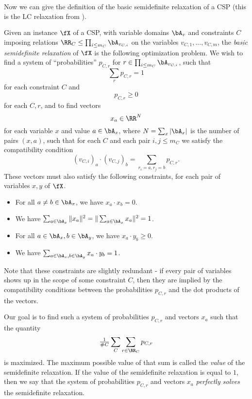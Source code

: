 Now we can give the definition of the basic semidefinite relaxation of a CSP (this is the LC relaxation from \cite{raghavendra-thesis}).

\begin{defn} Given an instance $\fX$ of a CSP, with variable domains $\bA_v$ and constraints $C$ imposing relations $\RR_C \le \prod_{i \le m_C} \bA_{v_{C,i}}$ on the variables $v_{C,1}, ..., v_{C,m}$, the \emph{basic semidefinite relaxation} of $\fX$ is the following optimization problem. We wish to find a system of ``probabilities'' $p_{C,r}$ for $r \in \prod_{i \le m_C} \bA_{v_{C,i}}$, such that
\[
\sum_{r} p_{C,r} = 1
\]
for each constraint $C$ and
\[
p_{C,r} \ge 0
\]
for each $C,r$, and to find vectors
\[
x_a \in \RR^N
\]
for each variable $x$ and value $a \in \bA_x$, where $N = \sum_x |\bA_x|$ is the number of pairs $(x,a)$, such that for each $C$ and each pair $i,j \le m_C$ we satisfy the compatibility condition
\[
(v_{C,i})_a \cdot (v_{C,j})_b = \sum_{r_i = a, r_j = b} p_{C,r}.
\]
These vectors must also satisfy the following constraints, for each pair of variables $x,y$ of $\fX$.
\begin{itemize}
\item For all $a \ne b \in \bA_x$, we have $x_a \cdot x_b = 0$.
\item We have $\sum_{a \in \bA_x} \|x_a\|^2 = \|\sum_{a \in \bA_x} x_a\|^2 = 1$.
\item For all $a \in \bA_x, b \in \bA_y$, we have $x_a \cdot y_b \ge 0$.
\item We have $\sum_{a \in \bA_x, b \in \bA_y} x_a \cdot y_b = 1$.
\end{itemize}
Note that these constraints are slightly redundant - if every pair of variables shows up in the scope of some constraint $C$, then they are implied by the compatibility conditions between the probabilities $p_{C,r}$ and the dot products of the vectors.

Our goal is to find such a system of probabilities $p_{C,r}$ and vectors $x_a$ such that the quantity
\[
\tfrac{1}{\#C}\sum_C \sum_{r \in \RR_C} p_{C,r}
\]
is maximized. The maximum possible value of that sum is called the \emph{value} of the semidefinite relaxation. If the value of the semidefinite relaxation is equal to $1$, then we say that the system of probabilities $p_{C,r}$ and vectors $x_a$ \emph{perfectly solves} the semidefinite relaxation.
\end{defn}


